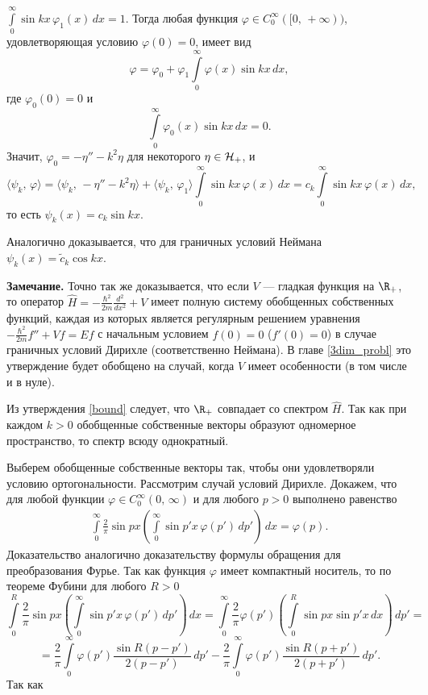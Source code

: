\documentclass[a4paper
]{article}
\begin{document}
$\int \limits_0^\infty \sin kx \, \varphi_1(x)\, dx=1$. Тогда любая
функция $\varphi\in C_0^\infty([0, \, +\infty))$, удовлетворяющая условию
$\varphi(0)=0$, имеет вид $$\varphi=\varphi_0+\varphi_1\int \limits_0^\infty
\varphi(x)\sin kx\, dx,$$ где $\varphi_0(0)=0$ и $$\int \limits_0^\infty
\varphi_0(x)\sin kx \, dx=0.$$ Значит, $\varphi_0=-\eta''-k^2\eta$ для
некоторого $\eta\in {\cal H}_+$,
и $$\langle \psi_k, \, \varphi\rangle=\langle \psi_k, \, -\eta''-k^2\eta
\rangle+\langle \psi_k, \, \varphi_1\rangle \int \limits _0^\infty \sin kx \,
\varphi(x)\, dx=c_k\int \limits _0^\infty \sin kx \, \varphi(x)\, dx,$$
то есть $\psi_k(x)=c_k\sin kx$. \par
Аналогично доказывается, что для граничных условий Неймана $\psi_k(x)=
\tilde c_k\cos kx$. \par
{\bf Замечание.} Точно так же доказывается, что если $V$ ---
гладкая функция на $\R_+$, то оператор $\hat H=-\frac{\hbar^2}{2m}
\frac{d^2}{dx^2}+V$ имеет полную систему обобщенных собственных
функций, каждая из которых является регулярным решением уравнения
$-\frac{\hbar^2}{2m}f''+Vf=Ef$ с начальным условием $f(0)=0$ ($f'(0)=0$)
в случае граничных условий Дирихле (соответственно Неймана). В главе
\ref{3dim_probl} это утверждение будет обобщено на случай, когда $V$
имеет особенности (в том числе и в нуле). \par
Из утверждения \ref{bound} следует, что $\R_+$ совпадает со спектром
$\hat H$. Так как при каждом $k>0$ обобщенные собственные векторы
образуют одномерное пространство, то спектр всюду однократный. \par
Выберем обобщенные собственные векторы так, чтобы они удовлетворяли
условию ортогональности. Рассмотрим случай условий Дирихле. Докажем, что
для любой функции $\varphi\in C_0^\infty(0, \, \infty)$ и для любого $p>0$
выполнено равенство
\begin{align}
\label{intsindelta}
\int \limits_0^\infty \frac{2}{\pi}\sin px\left(
\int \limits _0^\infty\sin p'x \, \varphi(p')\, dp'\right)\, dx=\varphi(p).
\end{align}
Доказательство аналогично доказательству формулы обращения для
преобразования Фурье. Так как функция $\varphi$ имеет компактный носитель,
то по теореме Фубини для любого $R>0$ $$\int \limits_0^R \frac{2}{\pi}
\sin px\left(\int \limits _0^\infty\sin p'x \,\varphi(p')\, dp'\right)\, dx=
\int \limits_0^\infty \frac{2}{\pi}\varphi(p')\left(\int\limits_0^R\sin px
\sin p'x\, dx\right)\, dp'=$$ $$=\frac{2}{\pi}\int \limits_0^\infty
\varphi(p')\frac{\sin R(p-p')}{2(p-p')}\, dp'-\frac{2}{\pi}\int \limits
_0^\infty\varphi(p')\frac{\sin R(p+p')}{2(p+p')}\, dp'.$$ Так как
\end{document}
